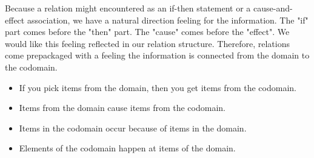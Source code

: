 \documentclass{ximera}
\begin{document}
Because a relation might encountered as an if-then statement or a cause-and-effect association, we have a natural direction feeling for the information.  The "if" part comes before the "then" part.  The "cause" comes before the "effect".  We would like this feeling reflected in our relation structure.  Therefore, relations come prepackaged with a feeling the information is connected from the domain to the codomain.
\begin{itemize}
\item If you pick items from the domain, then you get items from the codomain.
\item Items from the domain cause items from the codomain.
\item Items in the codomain occur because of items in the domain.
\item Elements of the codomain happen at items of the domain.
\end{itemize}
\end{document}
